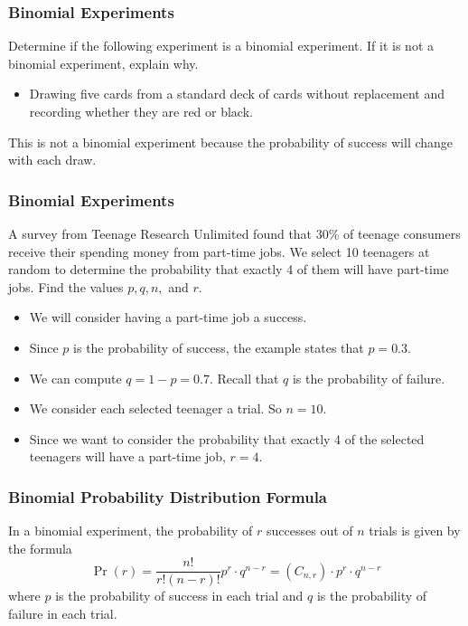 \documentclass[Lecture.tex]{subfiles}
\begin{document}
\begin{frame}
\frametitle{Binomial Experiments}
\begin{example}
Determine if the following experiment  is a binomial experiment.  If it is not a binomial experiment, explain why.
\begin{itemize}
\item Drawing five cards from a standard deck of cards without replacement and recording whether they are red or black.
\end{itemize}
\end{example}\pause
This is not a binomial experiment because the probability of success will change with each draw.
\vspace*{3in}
\end{frame}

\begin{frame}
\frametitle{Binomial Experiments}\pause
\begin{example}
A survey from Teenage Research Unlimited found that $30 \%$ of
teenage consumers receive their spending money from part-time jobs.
We select 10 teenagers at random to determine the probability that exactly 4 of them will have part-time jobs.  Find the values $p,q,n,$ and $r$.
\end{example}\pause
\begin{itemize}
\item We will consider having a part-time job a success.\pause
\item Since $p$ is the probability of success, the example states that $p=0.3$.\pause
\item We can compute $q=1-p=0.7$.  Recall that $q$ is the probability of failure.\pause
\item We consider each selected teenager a trial.  So $n=10$.\pause
\item Since we want to consider the probability that exactly 4 of the selected teenagers will have a part-time job, $r=4$.
\end{itemize}
\end{frame}

\begin{frame}
\frametitle{Binomial Probability Distribution Formula}\pause
In a binomial experiment, the probability of $r$ successes out of $n$ trials is given by the formula
$$\Pr(r)=\frac{n!}{r!(n-r)!}p^r\cdot q^{n-r}=(C_{n,r})\cdot p^r\cdot q^{n-r}$$
where $p$ is the probability of success in each trial and $q$ is the probability of failure in each trial.
\end{frame}
\end{document}
